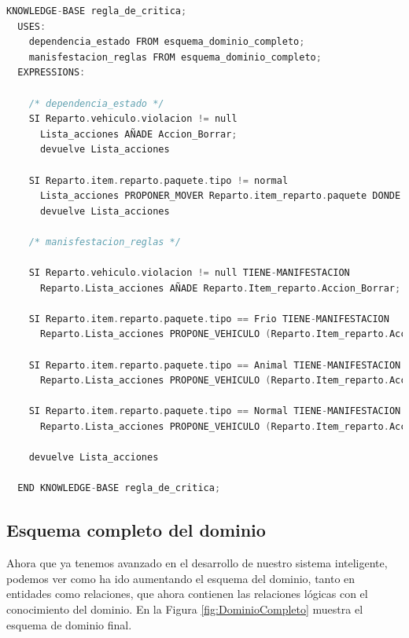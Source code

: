 \newpage    

\begin{lstlisting}[language=C,caption=\textbf{Regla\_de\_critica}]
  KNOWLEDGE-BASE regla_de_critica;
  USES:
    dependencia_estado FROM esquema_dominio_completo; 
    manisfestacion_reglas FROM esquema_dominio_completo;
  EXPRESSIONS:

    /* dependencia_estado */
    SI Reparto.vehiculo.violacion != null
      Lista_acciones AÑADE Accion_Borrar;
      devuelve Lista_acciones

    SI Reparto.item.reparto.paquete.tipo != normal
      Lista_acciones PROPONER_MOVER Reparto.item_reparto.paquete DONDE (paquete.tipo == vehiculo.tipo);
      devuelve Lista_acciones

    /* manisfestacion_reglas */

    SI Reparto.vehiculo.violacion != null TIENE-MANIFESTACION
      Reparto.Lista_acciones AÑADE Reparto.Item_reparto.Accion_Borrar;

    SI Reparto.item.reparto.paquete.tipo == Frio TIENE-MANIFESTACION
      Reparto.Lista_acciones PROPONE_VEHICULO (Reparto.Item_reparto.Accion_Añadir, frio)

    SI Reparto.item.reparto.paquete.tipo == Animal TIENE-MANIFESTACION
      Reparto.Lista_acciones PROPONE_VEHICULO (Reparto.Item_reparto.Accion_Añadir, animal)

    SI Reparto.item.reparto.paquete.tipo == Normal TIENE-MANIFESTACION
      Reparto.Lista_acciones PROPONE_VEHICULO (Reparto.Item_reparto.Accion_Añadir, normal)

    devuelve Lista_acciones
      
  END KNOWLEDGE-BASE regla_de_critica;
\end{lstlisting}
      
\newpage

\subsection{Esquema completo del dominio}
Ahora que ya tenemos avanzado en el desarrollo de nuestro sistema inteligente, podemos ver como ha ido aumentando el esquema del dominio, tanto en entidades como relaciones, que ahora contienen las relaciones lógicas con el conocimiento del dominio. En la Figura \ref{fig:DominioCompleto} muestra el esquema de dominio final.


